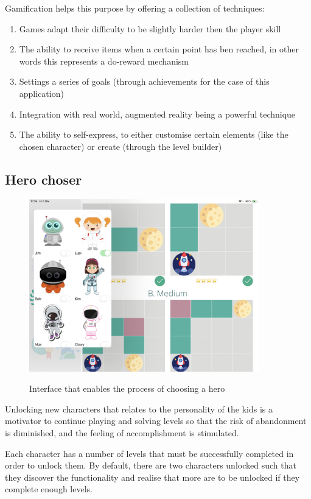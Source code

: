 \documentclass[12 pct]{report}
\begin{document}
Gamification helps this purpose by offering a collection of techniques:

\begin{enumerate}
\item Games adapt their difficulty to be slightly harder then the player skill
\item The ability to receive items when a certain point has ben reached, in other words this represents a do-reward mechanism
\item Settings a series of goals (through achievements for the case of this application)
\item Integration with real world, augmented reality being a powerful technique
\item The ability to self-express, to either customise certain elements (like the chosen character) or create (through the level builder)
\end{enumerate}
\subsection*{Hero choser}
\begin{figure}[H]
\includegraphics[width=0.89\textwidth]{ArRobotCode1}
\centering
\label{fig:feature-points}
\caption{Interface that enables the process of choosing a hero }
\end{figure}

Unlocking new characters that relates to the personality of the kids is a motivator to continue playing and solving levels so that the risk of abandonment is diminished, and the feeling of accomplishment is stimulated.

Each character has a number of levels that must be successfully completed in order to unlock them.  By default, there are two characters unlocked such that they discover the functionality and realise that more are to be unlocked if they complete enough levels.
\end{document}
